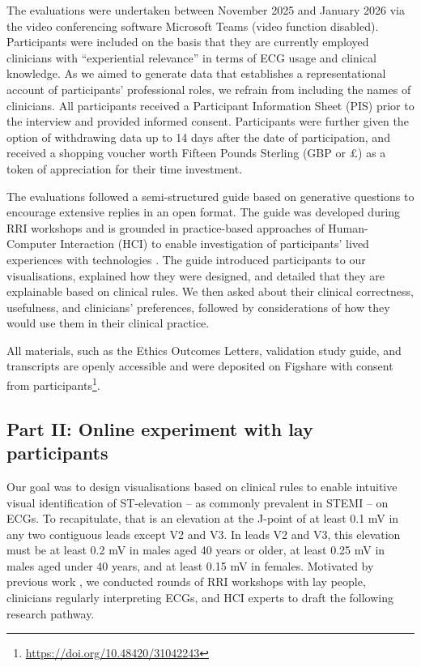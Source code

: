 \documentclass[
  10pt,
  letterpaper,
]{article}
\begin{document}
The evaluations were undertaken between November 2025 and January 2026
via the video conferencing software Microsoft Teams \cite{ms-teams}
(video function disabled). Participants were included on the basis that
they are currently employed clinicians with ``experiential relevance''
\cite[p. 124]{rudestam_surviving_2015} in terms of ECG usage and
clinical knowledge. As we aimed to generate data that establishes a
representational account of participants' professional roles, we refrain
from including the names of clinicians. All participants received a
Participant Information Sheet (PIS) prior to the interview and provided
informed consent. Participants were further given the option of
withdrawing data up to 14 days after the date of participation, and
received a shopping voucher worth Fifteen Pounds Sterling (GBP or £) as
a token of appreciation for their time investment.

The evaluations followed a semi-structured guide
\cite{lindlof_qualitative_2017} based on generative questions
\cite{rubin_qualitative_2005} to encourage extensive replies in an open
format. The guide was developed during RRI workshops and is grounded in
practice-based approaches of Human-Computer Interaction (HCI) to enable
investigation of participants' lived experiences with technologies
\cite{kuutti_turn_2014}. The guide introduced participants to our
visualisations, explained how they were designed, and detailed that they
are explainable based on clinical rules. We then asked about their
clinical correctness, usefulness, and clinicians' preferences, followed
by considerations of how they would use them in their clinical practice.

All materials, such as the Ethics Outcomes Letters, validation study
guide, and transcripts are openly accessible and were deposited on
Figshare with consent from
participants\footnote{\url{https://doi.org/10.48420/31042243}}.

\subsection{Part II: Online experiment with lay
participants}\label{sec-method-online-exp}

Our goal was to design visualisations based on clinical rules to enable
intuitive visual identification of ST-elevation -- as commonly prevalent
in STEMI -- on ECGs. To recapitulate, that is an elevation at the
J-point of at least 0.1 mV in any two contiguous leads except V2 and V3.
In leads V2 and V3, this elevation must be at least 0.2 mV in males aged
40 years or older, at least 0.25 mV in males aged under 40 years, and at
least 0.15 mV in females. Motivated by previous work
\citep{alahmadi_2023}, we conducted rounds of RRI workshops with lay
people, clinicians regularly interpreting ECGs, and HCI experts to draft
the following research pathway.
\end{document}
